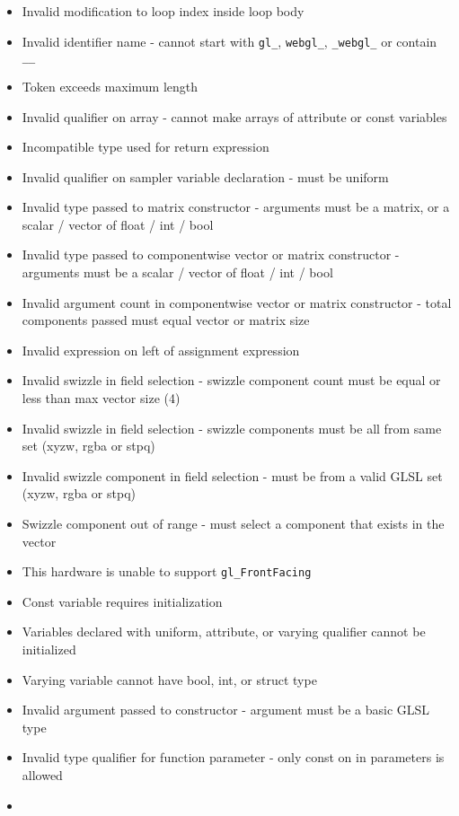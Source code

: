 \begin{itemize}
\item
  Invalid modification to loop index inside loop body
\item
  Invalid identifier name - cannot start with \texttt{gl\_},
  \texttt{webgl\_}, \texttt{\_webgl\_} or contain \texttt{\_\_}
\item
  Token exceeds maximum length
\item
  Invalid qualifier on array - cannot make arrays of attribute or const
  variables
\item
  Incompatible type used for return expression
\item
  Invalid qualifier on sampler variable declaration - must be uniform
\item
  Invalid type passed to matrix constructor - arguments must be a
  matrix, or a scalar / vector of float / int / bool
\item
  Invalid type passed to componentwise vector or matrix constructor -
  arguments must be a scalar / vector of float / int / bool
\item
  Invalid argument count in componentwise vector or matrix constructor -
  total components passed must equal vector or matrix size
\item
  Invalid expression on left of assignment expression
\item
  Invalid swizzle in field selection - swizzle component count must be
  equal or less than max vector size (4)
\item
  Invalid swizzle in field selection - swizzle components must be all
  from same set (xyzw, rgba or stpq)
\item
  Invalid swizzle component in field selection - must be from a valid
  GLSL set (xyzw, rgba or stpq)
\item
  Swizzle component out of range - must select a component that exists
  in the vector
\item
  This hardware is unable to support \texttt{gl\_FrontFacing}
\item
  Const variable requires initialization
\item
  Variables declared with uniform, attribute, or varying qualifier
  cannot be initialized
\item
  Varying variable cannot have bool, int, or struct type
\item
  Invalid argument passed to constructor - argument must be a basic GLSL
  type
\item
  Invalid type qualifier for function parameter - only const on in
  parameters is allowed
\item

\end{itemize}
